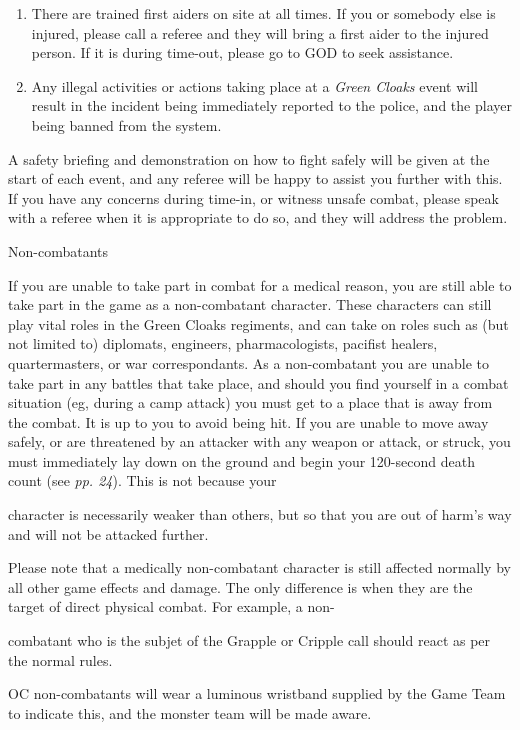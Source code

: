 \documentclass{scrbook}
\begin{document}
\begin{enumerate}[1]
\item There are trained first aiders on site at all times. If you or somebody else is injured, please call a referee and they will bring a first aider to the injured person. If it is during time-out, please go to GOD to seek assistance.

\item Any illegal activities or actions taking place at a \textit{Green Cloaks} event will result in the incident being immediately reported to the police, and the player being banned from the system.

\end{enumerate}

A safety briefing and demonstration on how to fight safely will be given at the start of each event, and any referee will be happy to assist you further with this. If you have any concerns during time-in, or witness unsafe combat, please speak with a referee when it is appropriate to do so, and they will address the problem.

Non-combatants

If you are unable to take part in combat for a medical reason, you are still able to take part in the game as a non-combatant character. These characters can still play vital roles in the Green Cloaks regiments, and can take on roles such as (but not limited to) diplomats, engineers, pharmacologists, pacifist healers, quartermasters, or war correspondants. As a non-combatant you are unable to take part in any battles that take place, and should you find yourself in a combat situation (eg, during a camp attack) you must get to a place that is away from the combat. It is up to you to avoid being hit. If you are unable to move away safely, or are threatened by an attacker with any weapon or attack, or struck, you must immediately lay down on the ground and begin your 120-second death count (see \textit{pp. 24}). This is not because your

character is necessarily weaker than others, but so that you are out of harm's way and will not be attacked further.

Please note that a medically non-combatant character is still affected normally by all other game effects and damage. The only difference is when they are the target of direct physical combat. For example, a non-

combatant who is the subjet of the Grapple or Cripple call should react as per the normal rules.

OC non-combatants will wear a luminous wristband supplied by the Game Team to indicate this, and the monster team will be made aware.
\end{document}
